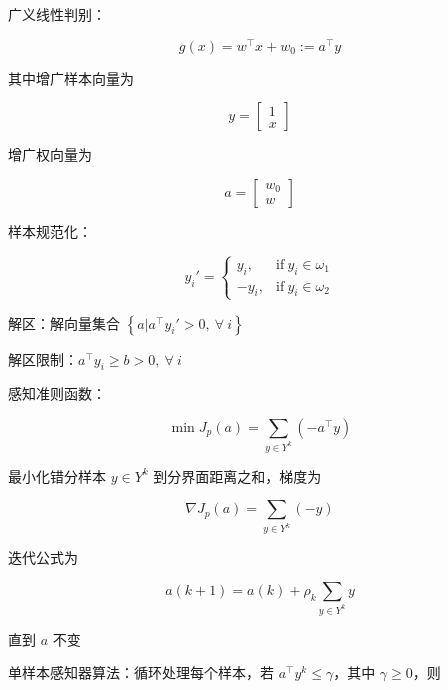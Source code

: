 \documentclass[openany,a4paper,12pt]{ctexbook}
\theoremstyle{kaiti}
\theoremstyle{normal}
\begin{document}
广义线性判别：

\begin{equation}
g(x)=w^{\top}x+w_0:=a^{\top}y
\end{equation}

其中增广样本向量为 

\begin{equation}
y=\begin{bmatrix}
  1\\ x
\end{bmatrix}
\end{equation}

增广权向量为 

\begin{equation}
a=\begin{bmatrix}
  w_0\\ w
\end{bmatrix}
\end{equation}

样本规范化：

\begin{equation}
y_{i}'=
\begin{cases}
  y_i, & \mathrm{if}~y_i\in \omega_1\\
  -y_i, & \mathrm{if}~y_i\in \omega_2
\end{cases}
\end{equation}

解区：解向量集合 $\left\{ a|a^{\top}y_{i}'>0,~\forall~i \right\}$

解区限制：$a^{\top}y_i\geqslant b>0,~\forall~i$

感知准则函数：

\begin{equation}
\min J_p\left(a \right)=\sum_{y\in Y^k}\left(-a^{\top}y \right)
\end{equation}

最小化错分样本 $y\in Y^k$ 到分界面距离之和，梯度为

\begin{equation}
\nabla J_p\left(a \right)=\sum_{y\in Y^k}\left(-y \right)
\end{equation}

迭代公式为

\begin{equation}
a\left(k+1 \right)=a\left(k \right)+\rho_k\sum_{y\in Y^k}y
\end{equation}

直到 $a$ 不变

单样本感知器算法：循环处理每个样本，若 $a^{\top}y^k\leqslant \gamma$，其中 $\gamma \geqslant 0$，则 
\end{document}
